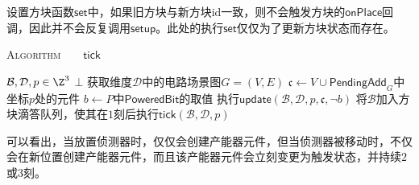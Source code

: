 \documentclass[a4,11pt]{aleph-notas}
\begin{document}
设置方块函数$\mathsf{set}$中，如果旧方块与新方块$\mathrm{id}$一致，则不会触发方块的$\mathsf{onPlace}$回调，因此并不会反复调用$\mathsf{setup}$。此处的执行$\mathsf{set}$仅仅为了更新方块状态而存在。

\begin{codigo}
\textsc{Algorithm}\ \ \ \ $\mathsf{tick}$
\begin{algorithmic}[1]
    \Require $\mathcal{B},\mathcal{D},p\in\Z^3$
    \Ensure $\bot$
        \State 获取维度$\mathcal{D}$中的电路场景图$G=(V,E)$
        \State $\mathfrak{c}\gets V\cup\textsf{PendingAdd}_G$中坐标$p$处的元件
        \State $b\gets P$中$\mathsf{PoweredBit}$的取值
        \State 执行$\mathsf{update}(\mathcal{B},\mathcal{D},p,\mathfrak{c},\neg b)$
    \Else
        \State 将$\mathcal{B}$加入方块滴答队列，使其在$1$刻后执行$\mathsf{tick}(\mathcal{B},\mathcal{D},p)$
    \EndIf
    \State \Return
\end{algorithmic}
\end{codigo}

可以看出，当放置侦测器时，仅仅会创建产能器元件，但当侦测器被移动时，不仅会在新位置创建产能器元件，而且该产能器元件会立刻变更为触发状态，并持续$2$或$3$刻。



\end{document}
